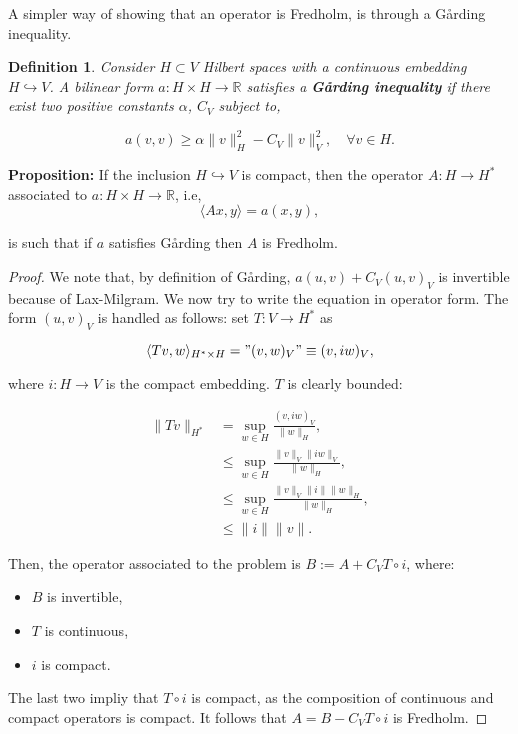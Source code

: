 \documentclass{article}
\newtheorem{definition}{Definition}
\newcommand{\R}{\mathbb{R}}
\begin{document}
A simpler way of showing that an operator is Fredholm, is through a Gårding inequality.

\begin{definition}
    Consider $H\subset V$ Hilbert spaces with a continuous embedding $H\hookrightarrow V$. 
    A bilinear form $a:H\times H\to \R$ satisfies a \textbf{Gårding inequality} if there exist two positive constants $\alpha$, $C_V$ subject to, 
    
    \[a(v,v) \geq \alpha \|v\|^2_H - C_V\|v\|^2_V,\quad \forall v\in H.\]
\end{definition}

\textbf{Proposition:}
 If the inclusion $H\hookrightarrow V$ is compact, then the operator $A: H\to H^*$ associated to $a:H\times H\to \R$, i.e,
 \[\langle Ax,y\rangle = a(x,y),\]

 is such that if $a$ satisfies Gårding then $A$ is Fredholm. 

\begin{proof}
    We note that, by definition of Gårding,  \(a(u,v) + C_V(u,v)_V\) is invertible because of Lax-Milgram. 
    We now try to write the equation in operator form. The form $(u,v)_V$ is handled as follows: set $T:V\to H^*$ as

    \[\langle Tv, w\rangle_{H^*\times H} = "(v,w)_V"\equiv (v,iw)_V,\]

    where $i: H\to V$ is the compact embedding. $T$ is clearly bounded:

    \begin{align*}
        \|Tv\|_{H^*} &= \sup_{w\in H}\frac{(v,iw)_V}{\|w\|_H},\\
        &\leq \sup_{w\in H}\frac{\|v\|_V\|iw\|_V}{\|w\|_H},\\
        &\leq \sup_{w\in H}\frac{\|v\|_V\|i\|\|w\|_H}{\|w\|_H},\\
        &\leq \|i\|\|v\|.
    \end{align*}

    Then, the operator associated to the problem is $B :=A + C_V T\circ i$, where:
    \begin{itemize}
        \item $B$ is invertible,
        \item $T$ is continuous,
        \item $i$ is compact. 
    \end{itemize}

    The last two impliy that $T\circ i$ is compact, as the composition of continuous and compact operators is compact. 
    It follows that $A = B - C_V T\circ i$ is Fredholm.
\end{proof}
\end{document}
